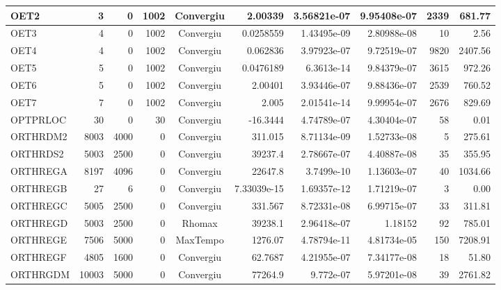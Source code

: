 \begin{center}
\begin{longtable}{|l|r|r|r|c|r|r|r|r|r|}
    OET2 &      3 &      0 &   1002 & Convergiu  &     2.00339 &    3.56821e-07 & 9.95408e-07 &   2339 &  681.77 \\ \hline
    OET3 &      4 &      0 &   1002 & Convergiu  &   0.0258559 &    1.43495e-09 & 2.80988e-08 &     10 &    2.56 \\ \hline
    OET4 &      4 &      0 &   1002 & Convergiu  &    0.062836 &    3.97923e-07 & 9.72519e-07 &   9820 & 2407.56 \\ \hline
    OET5 &      5 &      0 &   1002 & Convergiu  &   0.0476189 &     6.3613e-14 & 9.84379e-07 &   3615 &  972.26 \\ \hline
    OET6 &      5 &      0 &   1002 & Convergiu  &     2.00401 &    3.93446e-07 & 9.88436e-07 &   2539 &  760.52 \\ \hline
    OET7 &      7 &      0 &   1002 & Convergiu  &       2.005 &    2.01541e-14 & 9.99954e-07 &   2676 &  829.69 \\ \hline
OPTPRLOC &     30 &      0 &     30 & Convergiu  &    -16.3444 &    4.74789e-07 & 4.30404e-07 &     58 &    0.01 \\ \hline
ORTHRDM2 &   8003 &   4000 &      0 & Convergiu  &     311.015 &    8.71134e-09 & 1.52733e-08 &      5 &  275.61 \\ \hline
ORTHRDS2 &   5003 &   2500 &      0 & Convergiu  &     39237.4 &    2.78667e-07 & 4.40887e-08 &     35 &  355.95 \\ \hline
ORTHREGA &   8197 &   4096 &      0 & Convergiu  &     22647.8 &     3.7499e-10 & 1.13603e-07 &     40 & 1034.66 \\ \hline
ORTHREGB &     27 &      6 &      0 & Convergiu  & 7.33039e-15 &    1.69357e-12 & 1.71219e-07 &      3 &    0.00 \\ \hline
ORTHREGC &   5005 &   2500 &      0 & Convergiu  &     331.567 &    8.72331e-08 & 6.99715e-07 &     33 &  311.81 \\ \hline
ORTHREGD &   5003 &   2500 &      0 & Rhomax     &     39238.1 &    2.96418e-07 &     1.18152 &     92 &  785.01 \\ \hline
ORTHREGE &   7506 &   5000 &      0 & MaxTempo   &     1276.07 &    4.78794e-11 & 4.81734e-05 &    150 & 7208.91 \\ \hline
ORTHREGF &   4805 &   1600 &      0 & Convergiu  &     62.7687 &    4.21955e-07 & 7.34177e-08 &     18 &   51.80 \\ \hline
ORTHRGDM &  10003 &   5000 &      0 & Convergiu  &     77264.9 &      9.772e-07 & 5.97201e-08 &     39 & 2761.82 \\ \hline

\end{longtable}
\end{center}
